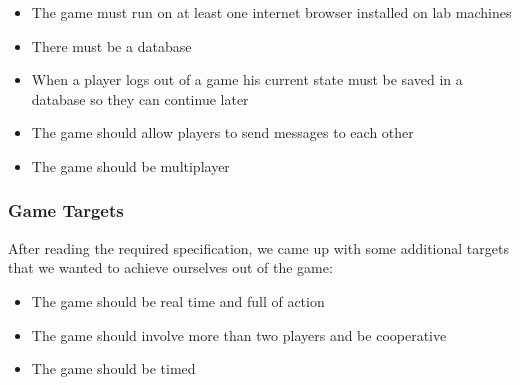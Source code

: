 \documentclass[a4wide, 11pt]{article}
\begin{document}
\begin{itemize}
\item The game must run on at least one internet browser installed on lab machines
\item There must be a database
\item When a player logs out of a game his current state must be saved in a database so they can continue later
\item The game should allow players to send messages to each other
\item The game should be multiplayer
\end{itemize}

\subsubsection{Game Targets}
After reading the required specification, we came up with some additional targets that we wanted to achieve ourselves out of the game:
\begin{itemize}
\item The game should be real time and full of action
\item The game should involve more than two players and be cooperative
\item The game should be timed
\end{itemize}
\end{document}
